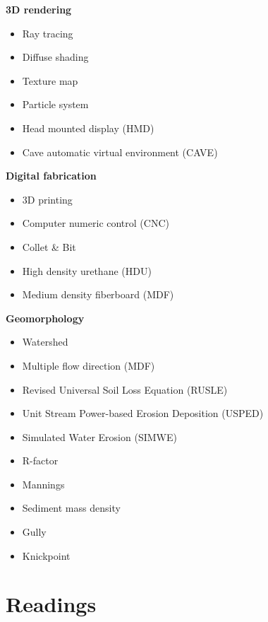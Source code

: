 \documentclass[11pt,article,oneside]{memoir}
\begin{document}
\begin{multicols}{2}
\textbf{3D rendering}
\begin{itemize}
\item Ray tracing
\item Diffuse shading
\item Texture map
\item Particle system
\item Head mounted display (HMD)
\item Cave automatic virtual environment (CAVE)
\end{itemize}

\textbf{Digital fabrication}
\begin{itemize}
\item 3D printing
\item Computer numeric control (CNC)
\item Collet \& Bit
\item High density urethane (HDU)
\item Medium density fiberboard (MDF)
\end{itemize}

\textbf{Geomorphology}
\begin{itemize}
\item Watershed
\item Multiple flow direction (MDF)
\item Revised Universal Soil Loss Equation (RUSLE)
\item Unit Stream Power-based Erosion Deposition (USPED)
\item Simulated Water Erosion (SIMWE)
\item R-factor
\item Mannings
\item Sediment mass density
\item Gully
\item Knickpoint
\end{itemize}
%
\end{multicols}

\clearpage

\section{Readings}
\renewcommand*{\bibfont}{\normalsize} %
\vspace*{0.5cm}
\nocite{*}
\setlength{}
\printbibliography[heading=none]

\clearpage
\end{document}
